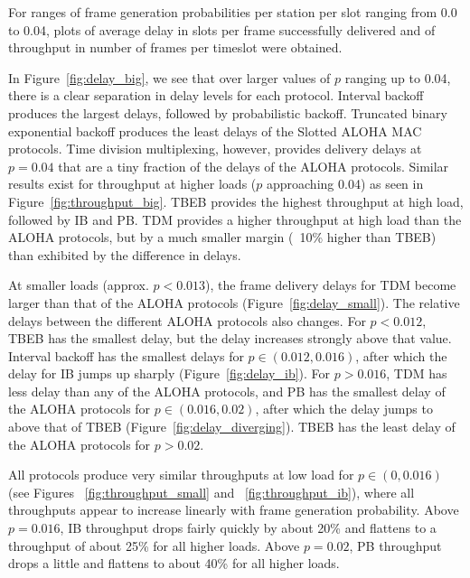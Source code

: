 \documentclass[twocolumn]{article}
\begin{document}
For ranges of frame generation probabilities per station per slot ranging
from 0.0 to 0.04, plots of average delay in slots per frame successfully delivered and
of throughput in number of frames per timeslot were obtained. 

In Figure~\ref{fig:delay_big}, we see that over larger values of $p$ ranging up to
0.04, there is a clear separation in delay levels for each protocol. Interval backoff
produces the largest delays, followed by probabilistic backoff. Truncated binary exponential
backoff produces the least delays of the Slotted ALOHA MAC protocols. Time division multiplexing,
however, provides delivery delays at $p=0.04$ that are a tiny fraction of the delays of the 
ALOHA protocols. Similar results exist for throughput at higher loads ($p$ approaching 0.04) as 
seen in Figure~\ref{fig:throughput_big}. TBEB provides the highest throughput at high load,
followed by IB and PB. TDM provides a higher throughput at high load than the ALOHA protocols,
but by a much smaller margin (~10\% higher than TBEB) than exhibited by the difference in
delays.

At smaller loads (approx. $p<0.013$), the frame delivery delays for TDM become
larger than that of the ALOHA protocols (Figure~\ref{fig:delay_small}). The relative delays 
between the different ALOHA protocols also changes. For $p<0.012$, TBEB has the smallest delay,
but the delay increases strongly above that value. Interval backoff has the smallest delays
for 
$p \in (0.012, 0.016)$, after which the delay for IB jumps up sharply (Figure~\ref{fig:delay_ib}).
For $p > 0.016$, TDM has less delay than any of the ALOHA protocols, and PB has the smallest 
delay of the ALOHA protocols for $p \in (0.016, 0.02)$, after which the delay jumps to above
that of TBEB (Figure~\ref{fig:delay_diverging}). TBEB has the least delay of the ALOHA protocols
for $p > 0.02$.

All protocols produce very similar throughputs at low load for $p \in (0, 0.016)$
(see Figures ~\ref{fig:throughput_small} and ~\ref{fig:throughput_ib}), where
all throughputs appear to increase linearly with frame generation probability. 
Above $p=0.016$, IB throughput drops fairly quickly by about 20\% and flattens to a throughput
of about 25\% for all higher loads. Above $p=0.02$, PB throughput drops a little and flattens
to about 40\% for all higher loads. 
\end{document}
